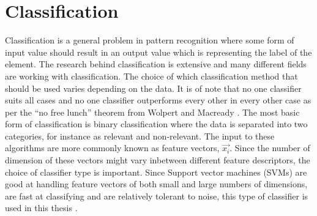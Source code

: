\section{Classification}

Classification is a general problem in pattern recognition where some form of input value should result in an output value which is representing the label of the element. The research behind classification is extensive and many different fields are working with classification. The choice of which classification method that should be used varies depending on the data. It is of note that no one classifier suits all cases and no one classifier outperforms every other in every other case as per the ``no free lunch'' theorem from Wolpert and Macready \cite{nflTheorem}. The most basic form of classification is binary classification where the data is separated into two categories, for instance as relevant and non-relevant. The input to these algorithms are more commonly known as feature vectors, $\vec{x_i}$. Since the number of dimension of these vectors might vary inbetween different feature descriptors, the choice of classifier type is important. Since Support vector machines (SVMs) are good at handling feature vectors of both small and large numbers of dimensions, are fast at classifying and are relatively tolerant to noise, this type of classifier is used in this thesis \cite{kotsiantis2007supervised}\cite{kadam2016study}. 

